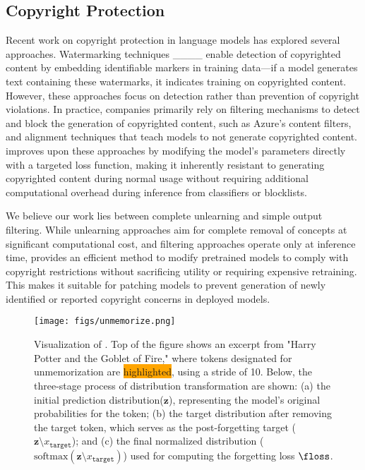 \subsection{Copyright Protection}
Recent work on copyright protection in language models has explored several approaches. Watermarking techniques ____ enable detection of copyrighted content by embedding identifiable markers in training data—if a model generates text containing these watermarks, it indicates training on copyrighted content. However, these approaches focus on detection rather than prevention of copyright violations.
In practice, companies primarily rely on filtering mechanisms to detect and block the generation of copyrighted content, such as Azure's content filters, and alignment techniques that teach models to not generate copyrighted content. \system{} improves upon these approaches by modifying the model's parameters directly with a targeted loss function, making it inherently resistant to generating copyrighted content during normal usage without requiring additional computational overhead during inference from classifiers or blocklists.

We believe our work lies between complete unlearning and simple output filtering. While unlearning approaches aim for complete removal of concepts at significant computational cost, and filtering approaches operate only at inference time, \system{} provides an efficient method to modify pretrained models to comply with copyright restrictions without sacrificing utility or requiring expensive retraining. This makes it suitable for patching models to prevent generation of newly identified or reported copyright concerns in deployed models.


\begin{figure*}[!t]
\centering
\texttt{[image: figs/unmemorize.png]}
\caption{
Visualization of \system{}. Top of the figure shows an excerpt from "Harry Potter and the Goblet of Fire," where tokens designated for unmemorization are {\colorbox{orange}{highlighted}}, using a stride of 10. Below, the three-stage process of distribution transformation are shown: (a) the initial prediction distribution($\mathbf{z}$), representing the model's original probabilities for the  token; (b) the target distribution after removing the target token, which serves as the post-forgetting target (${\mathbf{z}{\setminus x_\texttt{target}}}$); and (c) the final normalized distribution ($\text{softmax}\left({\mathbf{z}{\setminus x_\texttt{target}}}\right)$) used for computing the forgetting loss $\floss$.
}
\label{fig:mainFig}
\end{figure*}